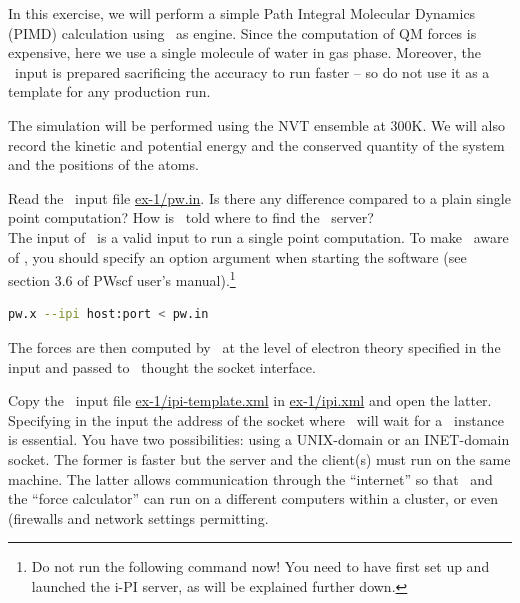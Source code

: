 \documentclass{article}
\begin{document}
\begin{Exercise}[label={i-pi},title={PIMD: a client/server approach}]

In this exercise, we will perform a simple Path Integral Molecular
Dynamics (PIMD) 
calculation using \PWscf\ as engine. Since the computation of QM forces is
expensive, here we use a single molecule of water in gas phase. Moreover, the
\PWscf\ input is prepared sacrificing the accuracy to run faster -- so do not use
it as a template for any production run.

The simulation will be performed using the NVT ensemble at 300K.  We
will also record the kinetic and potential energy and the conserved
quantity of the system and the positions of the atoms.

\Question
Read the \PWscf\ input file \url{ex-1/pw.in}.
Is there any difference compared to a plain single point computation?
How is \pwx\ told where to find the \ipi\ server?\\

The input of \pwx\ is a valid input to run a single point
computation. To make \pwx\ aware of \ipi, you should specify an option argument
when starting the software (see section 3.6 of PWscf user's
manual).\footnote{Do not run the following command now! You need to have 
first set up and launched the i-PI server, as will be explained further down.}

\begin{lstlisting}[language=bash]
pw.x --ipi host:port < pw.in
\end{lstlisting}

The forces are then computed by \pwx\ at the level of electron theory
specified in the input and passed to \ipi\ thought the socket
interface.

\Question
Copy the \ipi\ input file \url{ex-1/ipi-template.xml} in
\url{ex-1/ipi.xml} and open the latter. Specifying in 
the input the address of the socket where \ipi\ will wait for a \pwx\
instance is essential. You have two possibilities: using a UNIX-domain
or an INET-domain socket. The former is faster but the server and the
client(s) must run on the same machine. The latter allows communication
through the ``internet'' so that \ipi\ and the ``force
calculator'' can run on a different computers within a cluster, or 
even (firewalls and network settings permitting.


\end{Exercise}
\end{document}
